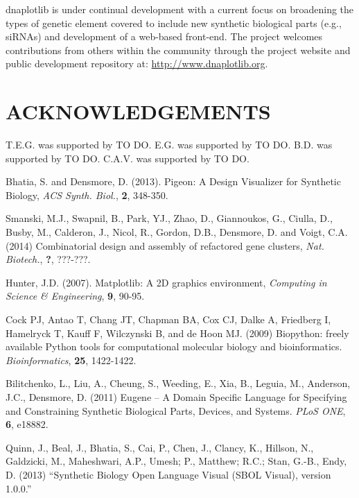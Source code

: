 \documentclass{bioinfo}
\begin{document}

dnaplotlib is under continual development with a current focus on broadening the types of genetic element covered to include new synthetic biological parts (e.g., siRNAs) and development of a web-based front-end. The project welcomes contributions from others within the community through the project website and public development repository at: \href{http://www.dnaplotlib.org}{http://www.dnaplotlib.org}.

\section*{ACKNOWLEDGEMENTS}
T.E.G. was supported by TO DO. E.G. was supported by TO DO. B.D. was supported by TO DO. C.A.V. was supported by TO DO.

\begin{thebibliography}{}
	
 Bhatia, S. and Densmore, D. (2013). Pigeon: A Design Visualizer for Synthetic Biology, {\it ACS Synth. Biol.}, {\bf 2}, 348-350.

 Smanski, M.J., Swapnil, B., Park, YJ., Zhao, D., Giannoukos, G., Ciulla, D., Busby, M., Calderon, J., Nicol, R., Gordon, D.B., Densmore, D. and Voigt, C.A. (2014) Combinatorial design and assembly of refactored gene clusters, {\it Nat. Biotech.}, {\bf ?}, ???-???.

 Hunter, J.D. (2007). Matplotlib: A 2D graphics environment, {\it Computing in Science \& Engineering}, {\bf 9}, 90-95.

Cock PJ, Antao T, Chang JT, Chapman BA, Cox CJ, Dalke A, Friedberg I, Hamelryck T, Kauff F, Wilczynski B, and de Hoon MJ. (2009) Biopython: freely available Python tools for computational molecular biology and bioinformatics. {\it Bioinformatics}, {\bf 25}, 1422-1422.


Bilitchenko, L., Liu, A., Cheung, S., Weeding, E., Xia, B., Leguia, M., Anderson, J.C., Densmore, D. (2011) Eugene – A Domain Specific Language for Specifying and Constraining Synthetic Biological Parts, Devices, and Systems. {\it PLoS ONE}, {\bf 6}, e18882.

Quinn, J., Beal, J., Bhatia, S., Cai, P., Chen, J., Clancy, K., Hillson, N., Galdzicki, M., Maheshwari, A.P., Umesh; P., Matthew; R.C.; Stan, G.-B., Endy, D. (2013) ``Synthetic Biology Open Language Visual (SBOL Visual), version 1.0.0.''


\end{thebibliography}
\end{document}

